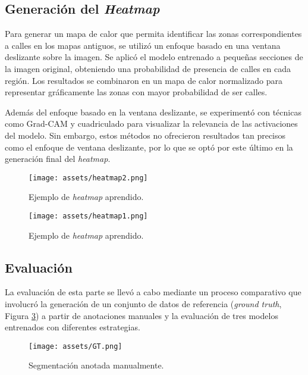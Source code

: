 \documentclass[twocolumn, fontsize=10pt]{article}
\begin{document}
\subsection{Generación del \textit{Heatmap}}
Para generar un mapa de calor que permita identificar las zonas correspondientes a calles en los mapas antiguos, se utilizó un enfoque basado en una ventana deslizante sobre la imagen. Se aplicó el modelo entrenado a pequeñas secciones de la imagen original, obteniendo una probabilidad de presencia de calles en cada región. Los resultados se combinaron en un mapa de calor normalizado para representar gráficamente las zonas con mayor probabilidad de ser calles.

Además del enfoque basado en la ventana deslizante, se experimentó con técnicas como Grad-CAM y cuadriculado para visualizar la relevancia de las activaciones del modelo. Sin embargo, estos métodos no ofrecieron resultados tan precisos como el enfoque de ventana deslizante, por lo que se optó por este último en la generación final del \textit{heatmap}.


\begin{figure}[H]
    \centering
    \texttt{[image: assets/heatmap2.png]}
    \caption{Ejemplo de \textit{heatmap} aprendido.}
    \label{fig:heatmap2}
\end{figure}

\begin{figure}[H]
    \centering
    \texttt{[image: assets/heatmap1.png]}
    \caption{Ejemplo de \textit{heatmap} aprendido.}
    \label{fig:heatmap1}
\end{figure}

\subsection{Evaluación}

La evaluaci\'on de esta parte se llev\'o a cabo 
mediante un proceso comparativo que involucr\'o la 
generaci\'on de un conjunto de datos de referencia 
(\textit{ground truth}, Figura \ref{fig:gt}) a partir de anotaciones 
manuales y la evaluaci\'on de tres modelos entrenados 
con diferentes estrategias. 

\begin{figure}[H]
    \centering
    \texttt{[image: assets/GT.png]}
    \caption{Segmentaci\'on anotada manualmente.}
    \label{fig:gt}
\end{figure}
\end{document}
